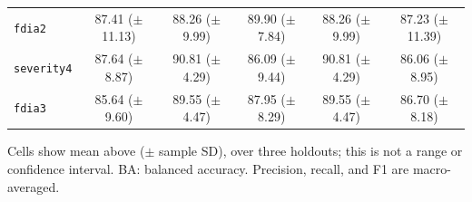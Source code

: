 \documentclass[letterpaper,journal]{IEEEtran}
\begin{document}
\begin{table}[t]
\begin{tabular}{@{}lccccc@{}}
\texttt{fdia2} & \shortstack{87.41\\($\pm$11.13)} & \shortstack{88.26\\($\pm$9.99)} & \shortstack{89.90\\($\pm$7.84)} & \shortstack{88.26\\($\pm$9.99)} & \shortstack{87.23\\($\pm$11.39)} \\
\texttt{severity4} & \shortstack{87.64\\($\pm$8.87)} & \shortstack{90.81\\($\pm$4.29)} & \shortstack{86.09\\($\pm$9.44)} & \shortstack{90.81\\($\pm$4.29)} & \shortstack{86.06\\($\pm$8.95)} \\
\texttt{fdia3} & \shortstack{85.64\\($\pm$9.60)} & \shortstack{89.55\\($\pm$4.47)} & \shortstack{87.95\\($\pm$8.29)} & \shortstack{89.55\\($\pm$4.47)} & \shortstack{86.70\\($\pm$8.18)} \\
\hline\end{tabular}
\par\smallskip\begin{minipage}{\columnwidth}\scriptsize Cells show mean above ($\pm$ sample SD), over three holdouts; this is not a range or confidence interval. BA: balanced accuracy. Precision, recall, and F1 are macro-averaged.\end{minipage}
\end{table}
\end{document}
